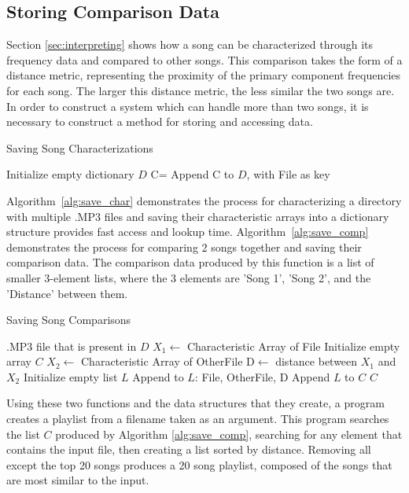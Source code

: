 \documentclass[conference]{IEEEtran}
\begin{document}
\subsection{Storing Comparison Data}\label{sec:storing}
Section \eqref{sec:interpreting} shows how a song can be characterized through its frequency data and compared to other songs. This comparison takes the form of a distance metric, representing the proximity of the primary component frequencies for each song. The larger this distance metric, the less similar the two songs are. In order to construct a system which can handle more than two songs, it is necessary to construct a method for storing and accessing data.
\begin{algorithm}
  \caption{Saving Song Characterizations}\label{alg:save_char}
  \begin{algorithmic}
    \State Initialize empty dictionary $D$
    \EndIf
    \State C=
    \State Append C to $D$, with File as key
    \State {}
    \EndIf
    \EndFor
    \State {}
    \EndFunction
  \end{algorithmic}
\end{algorithm}
Algorithm~\eqref{alg:save_char} demonstrates the process for characterizing a directory with multiple .MP3 files and saving their characteristic arrays into a dictionary structure provides fast access and lookup time. Algorithm~\eqref{alg:save_comp} demonstrates the process for comparing 2 songs together and saving their comparison data. The comparison data produced by this function is a list of smaller 3-element lists, where the 3 elements are 'Song 1', 'Song 2', and the 'Distance' between them.
\begin{algorithm}
  \caption{Saving Song Comparisons}\label{alg:save_comp}
  \begin{algorithmic}
    \Require .MP3 file that is present in $D$
    \State $X_1\gets$ Characteristic Array of File
    \State Initialize empty array $C$
    \EndIf
    \State $X_2\gets$ Characteristic Array of OtherFile
    \State D$\gets$ distance between $X_1$ and $X_2$
    \State Initialize empty list $L$
    \State Append to $L$: File, OtherFile, D
    \State Append $L$ to $C$
    \EndIf
    \EndFor
    \State \Return $C$
    \EndFunction
  \end{algorithmic}
\end{algorithm}
Using these two functions and the data structures that they create, a program creates a playlist from a filename taken as an argument. This program searches the list $C$ produced by Algorithm \eqref{alg:save_comp}, searching for any element that contains the input file, then creating a list sorted by distance. Removing all except the top 20 songs produces a 20 song playlist, composed of the songs that are most similar to the input. 
\end{document}
